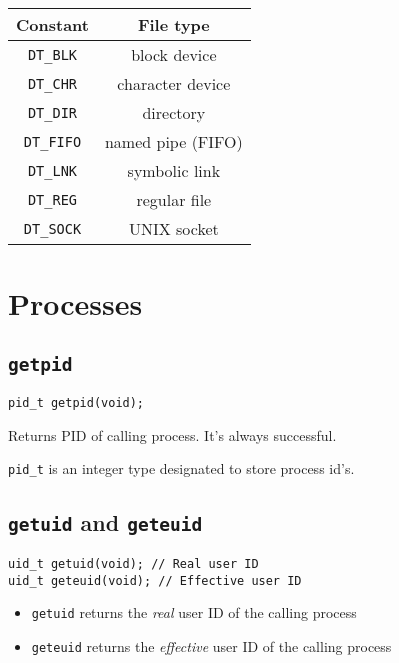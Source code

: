 \documentclass{article}
\begin{document}
\begin{center}
\begin{tabular}{ |c|c| }
    \hline \textbf{Constant} & \textbf{File type} \\ \hline \texttt{DT\_BLK} & block device \\ \hline
    \texttt{DT\_CHR} & character device \\ \hline 
    \texttt{DT\_DIR} & directory \\ \hline 
    \texttt{DT\_FIFO} & named pipe (FIFO) \\ \hline 
    \texttt{DT\_LNK} & symbolic link \\ \hline 
    \texttt{DT\_REG} & regular file \\ \hline 
    \texttt{DT\_SOCK} & UNIX socket \\ \hline 
\end{tabular}
\end{center}


\section{Processes}

\subsection{\texttt{getpid}}

\begin{verbatim}
pid_t getpid(void);
\end{verbatim}

Returns PID of calling process. It's always successful.

\texttt{pid\_t} is an integer type designated to store process id's.


\subsection{\texttt{getuid} and \texttt{geteuid}}

\begin{verbatim}
uid_t getuid(void); // Real user ID
uid_t geteuid(void); // Effective user ID
\end{verbatim}

\begin{itemize}
    \item \texttt{getuid} returns the \textit{real} user ID of the calling process
    \item \texttt{geteuid} returns the \textit{effective} user ID of the calling process
\end{itemize}
\end{document}
